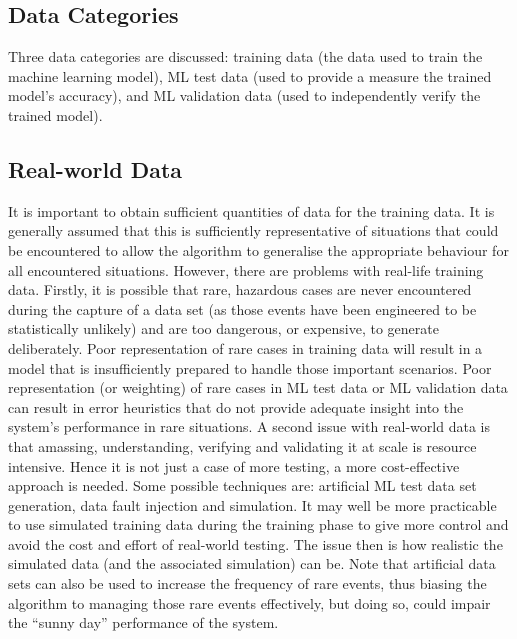 \subsection{Data Categories}
Three data categories are discussed: training data (the data used to train the machine learning model),
ML test data (used to provide a measure the trained model’s accuracy), and ML
validation data (used to independently verify the trained model).  

\subsection{Real-world Data}
It is important to obtain sufficient quantities of data for the training data. It is generally assumed that this is sufficiently representative of situations that could be encountered to allow the algorithm to generalise the appropriate behaviour for all encountered situations.  However, there are problems with real-life training data. Firstly, it is possible that rare, hazardous cases are never encountered during the capture of a data set (as those events have been engineered to be statistically unlikely) and are too dangerous, or expensive, to generate deliberately. Poor representation of rare cases in training data will result in a model that is insufficiently prepared to handle those important scenarios. Poor representation (or weighting) of rare cases in
ML test data or ML
validation data can result in error heuristics that do not provide adequate insight into the system’s performance in rare situations. A second issue with real-world data is that amassing, understanding, verifying and validating it at scale is resource intensive.
Hence it is not just a case of more testing, a more cost-effective approach is needed. Some possible techniques are: artificial
ML
test data set generation, data fault injection and simulation. It may well be more practicable to use simulated training data during the training phase to give more control and avoid the cost and effort of real-world testing. The issue then is how realistic the simulated data (and the associated simulation) can be. Note that artificial data sets can also be used to increase the frequency of rare events, thus biasing the algorithm to managing those rare events effectively, but doing so, could impair the ``sunny day'' performance of the system.

